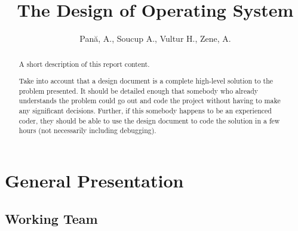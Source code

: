 \documentclass[a4paper,12pt]{report}
\title{The Design of \OSName{} Operating System}
\author{Pană, A., Soucup A., Vultur H., Zene, A. }
\begin{document}


\maketitle

\begin{abstract}
	A short description of this report content. 
	
	Take into account that a design document is a complete high-level solution to the problem presented. It should be detailed enough that somebody who already understands the problem could go out and code the project without having to make any significant decisions. Further, if this somebody happens to be an experienced coder, they should be able to use the design document to code the solution in a few hours (not necessarily including debugging). 
\end{abstract}


\chapter{General Presentation}

\section{Working Team}
\end{document}
